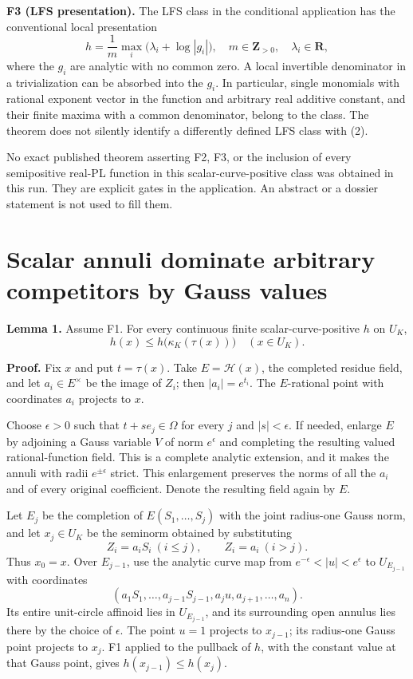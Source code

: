 \documentclass[11pt]{article}
\begin{document}
\textbf{F3 (LFS presentation).} The LFS class in the conditional application has the conventional local presentation
\[
h=\frac1m\max_i\bigl(\lambda_i+\log|g_i|\bigr),
\quad m\in\mathbf Z_{>0},\quad\lambda_i\in\mathbf R,
\tag{2}
\]
where the \(g_i\) are analytic with no common zero. A local invertible denominator in a trivialization can be absorbed into the \(g_i\). In particular, single monomials with rational exponent vector in the function and arbitrary real additive constant, and their finite maxima with a common denominator, belong to the class. The theorem does not silently identify a differently defined LFS class with (2).

No exact published theorem asserting F2, F3, or the inclusion of every semipositive real-PL function in this scalar-curve-positive class was obtained in this run. They are explicit gates in the application. An abstract or a dossier statement is not used to fill them.

\section{Scalar annuli dominate arbitrary competitors by Gauss values}

\textbf{Lemma 1.} Assume F1. For every continuous finite scalar-curve-positive \(h\) on \(U_K\),
\[
h(x)\leq h\bigl(\kappa_K(\tau(x))\bigr)
\quad(x\in U_K).
\tag{3}
\]

\textbf{Proof.} Fix \(x\) and put \(t=\tau(x)\). Take \(E=\mathcal H(x)\), the completed residue field, and let \(a_i\in E^\times\) be the image of \(Z_i\); then \(|a_i|=e^{t_i}\). The \(E\)-rational point with coordinates \(a_i\) projects to \(x\).

Choose \(\epsilon>0\) such that \(t+se_j\in\Omega\) for every \(j\) and \(|s|<\epsilon\). If needed, enlarge \(E\) by adjoining a Gauss variable \(V\) of norm \(e^\epsilon\) and completing the resulting valued rational-function field. This is a complete analytic extension, and it makes the annuli with radii \(e^{\pm\epsilon}\) strict. This enlargement preserves the norms of all the \(a_i\) and of every original coefficient. Denote the resulting field again by \(E\).

Let \(E_j\) be the completion of \(E(S_1,\ldots,S_j)\) with the joint radius-one Gauss norm, and let \(x_j\in U_K\) be the seminorm obtained by substituting
\[
Z_i=a_iS_i\ (i\leq j),\qquad Z_i=a_i\ (i>j).
\]
Thus \(x_0=x\). Over \(E_{j-1}\), use the analytic curve map from \(e^{-\epsilon}<|u|<e^\epsilon\) to \(U_{E_{j-1}}\) with coordinates
\[
(a_1S_1,\ldots,a_{j-1}S_{j-1},a_ju,a_{j+1},\ldots,a_n).
\tag{4}
\]
Its entire unit-circle affinoid lies in \(U_{E_{j-1}}\), and its surrounding open annulus lies there by the choice of \(\epsilon\). The point \(u=1\) projects to \(x_{j-1}\); its radius-one Gauss point projects to \(x_j\). F1 applied to the pullback of \(h\), with the constant value at that Gauss point, gives \(h(x_{j-1})\leq h(x_j)\).
\end{document}
